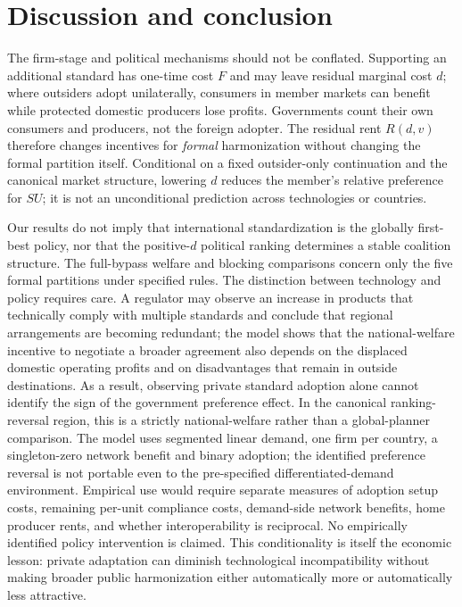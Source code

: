 \section{Discussion and conclusion}\label{sec:short-discussion}
The firm-stage and political mechanisms should not be conflated. Supporting an additional standard has one-time cost $F$ and may leave residual marginal cost $d$; where outsiders adopt unilaterally, consumers in member markets can benefit while protected domestic producers lose profits. Governments count their own consumers and producers, not the foreign adopter. The residual rent $R(d,v)$ therefore changes incentives for \emph{formal} harmonization without changing the formal partition itself. Conditional on a fixed outsider-only continuation and the canonical market structure, lowering $d$ reduces the member's relative preference for $SU$; it is not an unconditional prediction across technologies or countries.

Our results do not imply that international standardization is the globally first-best policy, nor that the positive-$d$ political ranking determines a stable coalition structure. The full-bypass welfare and blocking comparisons concern only the five formal partitions under specified rules. The distinction between technology and policy requires care. A regulator may observe an increase in products that technically comply with multiple standards and conclude that regional arrangements are becoming redundant; the model shows that the national-welfare incentive to negotiate a broader agreement also depends on the displaced domestic operating profits and on disadvantages that remain in outside destinations. As a result, observing private standard adoption alone cannot identify the sign of the government preference effect. In the canonical ranking-reversal region, this is a strictly national-welfare rather than a global-planner comparison. The model uses segmented linear demand, one firm per country, a singleton-zero network benefit and binary adoption; the identified preference reversal is not portable even to the pre-specified differentiated-demand environment. Empirical use would require separate measures of adoption setup costs, remaining per-unit compliance costs, demand-side network benefits, home producer rents, and whether interoperability is reciprocal. No empirically identified policy intervention is claimed. This conditionality is itself the economic lesson: private adaptation can diminish technological incompatibility without making broader public harmonization either automatically more or automatically less attractive.
